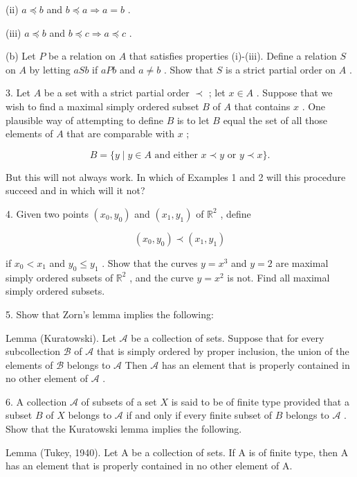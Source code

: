 \documentclass[10pt]{article}
\begin{document}
(ii) \(a \preccurlyeq  b\) and \(b \preccurlyeq  a \Rightarrow  a = b\) .

(iii) \(a \preccurlyeq  b\) and \(b \preccurlyeq  c \Rightarrow  a \preccurlyeq  c\) .

(b) Let \(P\) be a relation on \(A\) that satisfies properties (i)-(iii). Define a relation \(S\) on \(A\) by letting \({aSb}\) if \({aPb}\) and \(a \neq  b\) . Show that \(S\) is a strict partial order on \(A\) .

3. Let \(A\) be a set with a strict partial order \(\prec\) ; let \(x \in  A\) . Suppose that we wish to find a maximal simply ordered subset \(B\) of \(A\) that contains \(x\) . One plausible way of attempting to define \(B\) is to let \(B\) equal the set of all those elements of \(A\) that are comparable with \(x\) ;

\[
B = \{ y \mid  y \in  A\text{ and either }x \prec  y\text{ or }y \prec  x\} .
\]

But this will not always work. In which of Examples 1 and 2 will this procedure succeed and in which will it not?

4. Given two points \(\left( {{x}_{0},{y}_{0}}\right)\) and \(\left( {{x}_{1},{y}_{1}}\right)\) of \({\mathbb{R}}^{2}\) , define

\[
\left( {{x}_{0},{y}_{0}}\right)  \prec  \left( {{x}_{1},{y}_{1}}\right)
\]

if \({x}_{0} < {x}_{1}\) and \({y}_{0} \leq  {y}_{1}\) . Show that the curves \(y = {x}^{3}\) and \(y = 2\) are maximal simply ordered subsets of \({\mathbb{R}}^{2}\) , and the curve \(y = {x}^{2}\) is not. Find all maximal simply ordered subsets.

5. Show that Zorn's lemma implies the following:

Lemma (Kuratowski). Let \(\mathcal{A}\) be a collection of sets. Suppose that for every subcollection \(\mathcal{B}\) of \(\mathcal{A}\) that is simply ordered by proper inclusion, the union of the elements of \(\mathcal{B}\) belongs to \(\mathcal{A}\) Then \(\mathcal{A}\) has an element that is properly contained in no other element of \(\mathcal{A}\) .

6. A collection \(\mathcal{A}\) of subsets of a set \(X\) is said to be of finite type provided that a subset \(B\) of \(X\) belongs to \(\mathcal{A}\) if and only if every finite subset of \(B\) belongs to \(\mathcal{A}\) . Show that the Kuratowski lemma implies the following.

Lemma (Tukey, 1940). Let A be a collection of sets. If A is of finite type, then A has an element that is properly contained in no other element of A.
\end{document}
